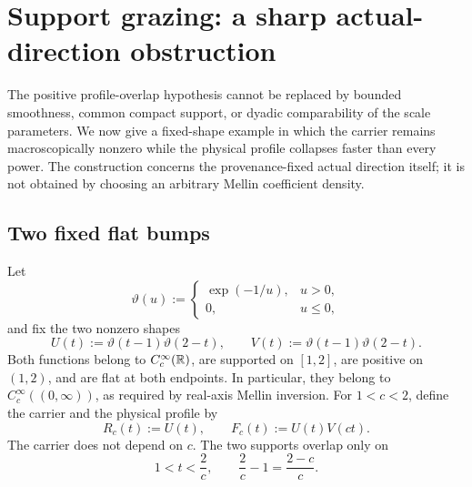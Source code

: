 \section{Support grazing: a sharp actual-direction obstruction}
\label{sec:tpc52-grazing}

The positive profile-overlap hypothesis cannot be replaced by bounded
smoothness, common compact support, or dyadic comparability of the
scale parameters.  We now give a fixed-shape example in which the
carrier remains macroscopically nonzero while the physical profile
collapses faster than every power.  The construction concerns the
provenance-fixed actual direction itself; it is not obtained by
choosing an arbitrary Mellin coefficient density.

\subsection{Two fixed flat bumps}

Let
\begin{equation}
 \vartheta(u):=
 \begin{cases}
  \exp(-1/u),&u>0,\\
  0,&u\leq0,
 \end{cases}
 \label{eq:tpc52-flat-half-bump}
\end{equation}
and fix the two nonzero shapes
\begin{equation}
 U(t):=\vartheta(t-1)\vartheta(2-t),
 \qquad
 V(t):=\vartheta(t-1)\vartheta(2-t).
 \label{eq:tpc52-fixed-flat-bumps}
\end{equation}
Both functions belong to \(C_c^\infty(\mathbb R)\), are supported on
\([1,2]\), are positive on \((1,2)\), and are flat at both endpoints.
In particular, they belong to \(C_c^\infty((0,\infty))\), as required
by real-axis Mellin inversion.  For \(1<c<2\), define the carrier and
the physical profile by
\begin{equation}
 R_c(t):=U(t),
 \qquad
 F_c(t):=U(t)V(ct).
 \label{eq:tpc52-grazing-carrier-profile}
\end{equation}
The carrier does not depend on \(c\).  The two supports overlap only on
\begin{equation}
 1<t<\frac2c,
 \qquad
 \frac2c-1=\frac{2-c}{c}.
 \label{eq:tpc52-grazing-overlap-interval}
\end{equation}


